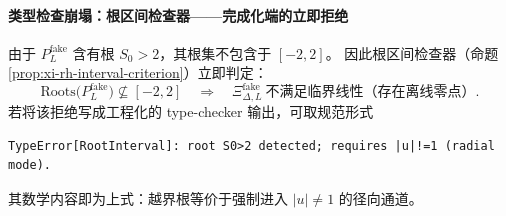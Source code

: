 \paragraph{类型检查崩塌：根区间检查器——完成化端的立即拒绝}
由于 \(P^{\mathrm{fake}}_L\) 含有根 \(S_0>2\)，其根集不包含于 \([-2,2]\)。
因此根区间检查器（命题 \ref{prop:xi-rh-interval-criterion}）立即判定：
\[
\mathrm{Roots}\bigl(P^{\mathrm{fake}}_L\bigr)\not\subseteq [-2,2]
\quad\Longrightarrow\quad
\Xi^{\mathrm{fake}}_{\Delta,L}\ \text{不满足临界线性（存在离线零点）}.
\]
若将该拒绝写成工程化的 type-checker 输出，可取规范形式
\begin{verbatim}
TypeError[RootInterval]: root S0>2 detected; requires |u|!=1 (radial mode).
\end{verbatim}
其数学内容即为上式：越界根等价于强制进入 \(|u|\neq 1\) 的径向通道。

